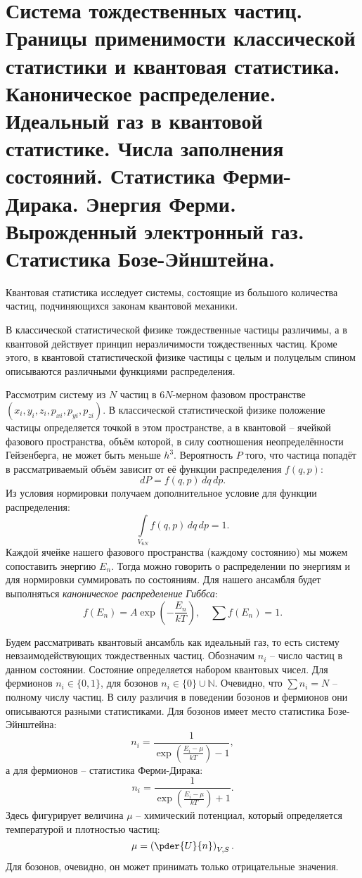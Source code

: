 \chapter{Система тождественных частиц. Границы применимости классической 
статистики и квантовая статистика. Каноническое распределение. 
Идеальный газ в квантовой статистике. Числа заполнения состояний. 
Статистика Ферми-Дирака. Энергия Ферми. Вырожденный электронный газ. 
Статистика Бозе-Эйнштейна.}

Квантовая статистика исследует системы, состоящие из большого количества частиц,
подчиняющихся законам квантовой механики.

В классической статистической физике тождественные частицы различимы, а
в квантовой действует принцип неразличимости тождественных частиц. Кроме этого,
в квантовой статистической физике частицы с целым и полуцелым спином описываются
различными функциями распределения.

Рассмотрим систему из \( N \) частиц в \( 6N \)-мерном фазовом пространстве
\( (x_i, y_i, z_i, p_{xi}, p_{yi}, p_{zi}) \). В классической статистической
физике положение частицы определяется точкой в этом пространстве, а в квантовой
-- ячейкой фазового пространства, объём которой, в силу соотношения
неопределённости Гейзенберга, не может быть меньше \( h^3 \). Вероятность
\( P \) того, что частица попадёт в рассматриваемый объём зависит от её функции
распределения \( f(q,p) \):
\[
    dP = f(q,p)\,dq\,dp.
\]
Из условия нормировки получаем дополнительное условие для функции распределения:
\[
    \int\limits_{V_{6N}} f(q,p)\,dq\,dp = 1.
\]
Каждой ячейке нашего фазового пространства (каждому состоянию) мы можем
сопоставить энергию \( E_n \). Тогда можно говорить о распределении по энергиям
и для нормировки суммировать по состояниям. Для нашего ансамбля будет
выполняться \emph{каноническое распределение Гиббса}:
\[
    f(E_n) = A\exp(-\frac{E_n}{kT}),\quad\sum f(E_n) = 1.
\]

Будем рассматривать квантовый ансамбль как идеальный газ, то есть систему
невзаимодействующих тождественных частиц. Обозначим \( n_i \) -- число
частиц в данном состоянии. Состояние определяется набором квантовых чисел.
Для фермионов \( n_i\in\{0,1\} \), для бозонов \( n_i\in\{0\}\cup\mathbb{N} \).
Очевидно, что \( \sum n_i = N \) -- полному числу частиц.
В силу различия в поведении бозонов и фермионов они описываются разными
статистиками. Для бозонов имеет место статистика Бозе-Эйнштейна:
\[
    n_i = \frac{1}{\exp(\frac{E_i-\mu}{kT}) - 1},
\]
а для фермионов -- статистика Ферми-Дирака:
\[
    n_i = \frac{1}{\exp(\frac{E_i-\mu}{kT}) + 1}.
\]
Здесь фигурирует величина \( \mu \) -- химический потенциал, который
определяется температурой и плотностью частиц:
\[
    \mu = \left(\pder{U}{n}\right)_{V,S}.
\]
Для бозонов, очевидно, он может принимать только отрицательные значения.

